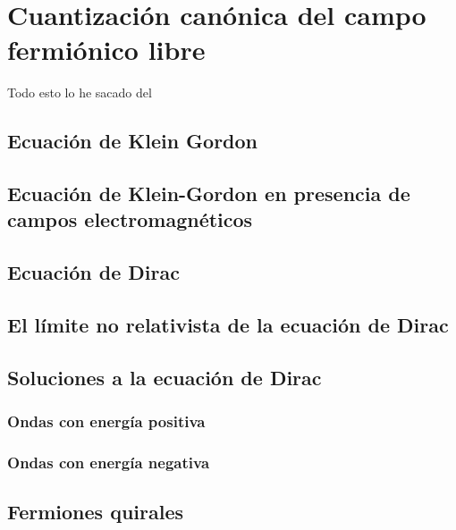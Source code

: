 \setchapterpreamble[u]{\margintoc}
\chapter{Cuantización canónica del campo fermiónico libre}

\begin{center}
  \large Todo esto lo he sacado del \cite{Dobdado}
\end{center}
\section{Ecuación de Klein Gordon}
\section{Ecuación de Klein-Gordon en presencia de campos electromagnéticos}
\section{Ecuación de Dirac}
\section{El límite no relativista de la ecuación de Dirac}
\section{Soluciones a la ecuación de Dirac}
\subsection{Ondas con energía positiva}
\subsection{Ondas con energía negativa}
\section{Fermiones quirales}